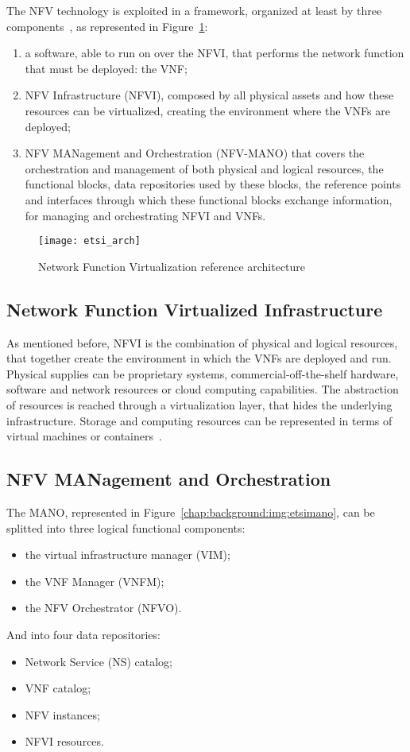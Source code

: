The NFV technology is exploited in a framework, organized
at least by three components~\cite{etsi2013gs}, as represented in
Figure~\ref{chap:background:img:etsi_arch}:
\begin{enumerate}
  \item a software, able to run on over the NFVI, that performs the network
  function that must be deployed: the VNF;
  \item NFV Infrastructure (NFVI), composed by all physical assets
  and how these resources can be virtualized, creating the environment where the
  VNFs
  are deployed;
  \item NFV MANagement and Orchestration (NFV-MANO) that covers the
  orchestration and management of both physical and logical resources, the
  functional blocks, data repositories used by these blocks, the reference
  points and interfaces through which these functional blocks exchange
  information, for managing and orchestrating NFVI and VNFs.
\end{enumerate}

\begin{figure}[t]
  \centering
  \texttt{[image: etsi\_arch]}
  \caption[Network Function Virtualization reference architecture]{Network
    Function Virtualization reference architecture~\cite{etsi2013gs}}
  \label{chap:background:img:etsi_arch}
\end{figure}

\subsection{Network Function Virtualized Infrastructure}
As mentioned before, NFVI is the combination of physical and logical resources,
that together create the environment in which the VNFs are deployed
and run. Physical supplies can be proprietary systems, commercial-off-the-shelf
hardware, software and network resources or cloud computing capabilities. The
abstraction of resources is reached through a virtualization layer,
that hides the underlying infrastructure. Storage and computing resources can
be represented in terms of virtual machines or
containers~\cite{mijumbi2016network}.

\subsection{NFV MANagement and Orchestration}
The MANO, represented in Figure~\ref{chap:background:img:etsimano}, can be
splitted into three logical functional components:
\begin{itemize}
  \item the virtual infrastructure manager (VIM);
  \item the VNF Manager (VNFM);
  \item the NFV Orchestrator (NFVO).
\end{itemize}
And into four data repositories:
\begin{itemize}
  \item Network Service (NS) catalog;
  \item VNF catalog;
  \item NFV instances;
  \item NFVI resources.
\end{itemize}

